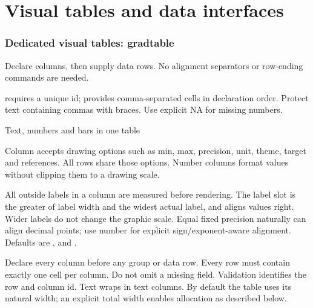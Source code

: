 \part{Visual tables and data interfaces}


\section{Dedicated visual tables: gradtable}
Declare columns, then supply data rows. No alignment separators or row-ending
commands are needed.

 requires a unique id;
 provides comma-separated cells in declaration order.
Protect text containing commas with braces. Use explicit NA for missing numbers.
\begin{demo}{Text, numbers and bars in one table}
\begin{gradtable}[preset=paper,graphic width=48mm,
  text width=24mm,label width=14mm,header align=c]
\end{gradtable}
\end{demo}
Column  accepts drawing options such as min, max, precision,
unit, theme, target and references. All rows share those options. Number columns
format values without clipping them to a drawing scale.

All outside labels in a column are measured before rendering. The label slot is
the greater of label width and the widest actual label, and aligns values right.
Wider labels do not change the graphic scale. Equal fixed precision naturally
can align decimal points; use number  for explicit sign/exponent-aware alignment.
Defaults are ,  and .

Declare every column before any group or data row. Every row must contain exactly
one cell per column. Do not omit a missing field. Validation identifies the row
and column id. Text wraps in text columns. By default the table uses its natural
width; an explicit total width enables allocation as described below.

